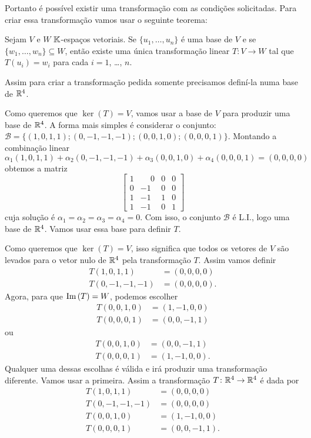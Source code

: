 \documentclass[12pt]{exam}
\begin{document}
    Portanto é possível existir uma transforma\c{c}ão com as condi\c{c}ões solicitadas. Para criar essa transforma\c{c}ão vamos usar o seguinte teorema:
    \begin{tcolorbox}[colback=green!30, colframe=green!80!blue, title=Teorema]
        Sejam $V$ e $W$ $\mathbb{K}$-espa\c{c}os vetoriais. Se $\{u_1, \dots, u_n\}$ é uma base de $V$ e se $\{w_1, \dots, w_n\} \subseteq W$, então existe uma única transforma\c{c}ão linear $T \colon V \to W$ tal que $T(u_i) = w_i$ para cada $i = 1$, \dots, $n$.
    \end{tcolorbox}

    Assim para criar a transforma\c{c}ão pedida somente precisamos definí-la numa base de $\mathbb{R}^4$.

    Como queremos que $\ker(T) = V$, vamos usar a base de $V$ para produzir uma base de $\mathbb{R}^4$. A forma mais simples é considerar o conjunto: $\mathcal{B} = \{(1, 0, 1, 1); (0, -1, -1, -1); (0, 0, 1, 0); (0, 0, 0, 1)\}$. Montando a combina\c{c}ão linear
    \[
        \alpha_1(1, 0, 1, 1) + \alpha_2(0, -1, -1, -1) + \alpha_3(0, 0, 1, 0) + \alpha_4(0, 0, 0, 1) = (0, 0, 0, 0)
    \]
    obtemos a matriz
    \[
        \begin{bmatrix}
            1 & \phantom{-}0 & 0 & 0\\
            0 & -1 & 0 & 0\\
            1 & -1 & 1 & 0\\
            1 & -1 & 0 & 1
        \end{bmatrix}
    \]
    cuja solu\c{c}ão é $\alpha_1 = \alpha_2 = \alpha_3 = \alpha_4 = 0$.
    Com isso, o conjunto $\mathcal{B}$ é L.I., logo uma base de $\mathbb{R}^4$. Vamos usar essa base para definir $T$.

    Como queremos que $\ker(T) = V$, isso significa que todos os vetores de $V$ são levados para o vetor nulo de $\mathbb{R}^4$ pela transforma\c{c}ão $T$. Assim vamos definir
    \begin{align*}
        T(1, 0, 1, 1) &= (0, 0, 0, 0)\\
        T(0, -1, -1, -1) &= (0, 0, 0, 0).
    \end{align*}
    Agora, para que ${\rm Im\,}(T) = W$, podemos escolher
    \begin{align*}
        T(0, 0, 1, 0) &= (1, -1, 0, 0)\\
        T(0, 0, 0, 1) &= (0, 0, -1, 1)
    \end{align*}
    ou
    \begin{align*}
        T(0, 0, 1, 0) &= (0, 0, -1, 1)\\
        T(0, 0, 0, 1) &= (1, -1, 0, 0).
    \end{align*}
    Qualquer uma dessas escolhas é válida e irá produzir uma transforma\c{c}ão diferente. Vamos usar a primeira. Assim a transforma\c{c}ão $T \colon \mathbb{R}^4 \to \mathbb{R}^4$ é dada por
    \begin{align*}
        T(1, 0, 1, 1) &= (0, 0, 0, 0)\\
        T(0, -1, -1, -1) &= (0, 0, 0, 0)\\
        T(0, 0, 1, 0) &= (1, -1, 0, 0)\\
        T(0, 0, 0, 1) &= (0, 0, -1, 1).
    \end{align*}
\end{document}
